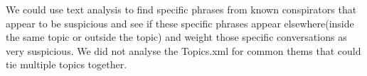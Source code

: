 \documentclass{icmmcm}
\begin{document}
 We could use text analysis to find specific phrases from known conspirators that appear to be suspicious and see if these specific phrases appear elsewhere(inside the same topic or outside the topic) and weight those specific conversations as very suspicious.  We did not analyse the Topics.xml for common thems that could tie multiple topics together.







\end{document}
